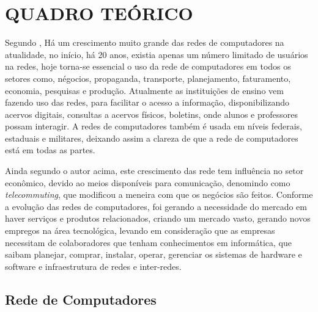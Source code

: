 
\chapter{QUADRO TEÓRICO}


\par Segundo , Há um crescimento muito grande das redes
de computadores na atualidade, no início, há 20 anos, existia apenas um número
limitado de usuários na redes, hoje torna-se essencial o uso da rede de
computadores em todos os setores como, négocios, propaganda, transporte,
planejamento, faturamento, economia, pesquisas e produção. Atualmente as
instituições de ensino vem fazendo uso das redes, para facilitar o acesso a
informação, disponibilizando acervos digitais, consultas a acervos físicos,
boletins, onde alunos e professores possam interagir. A redes de computadores
também é usada em níveis federais, estaduais e militares, deixando assim a
clareza de que a rede de computadores está em todas as partes.


\par Ainda segundo o autor acima, este crescimento das rede tem influência no
setor econômico, devido ao meios disponíveis para comunicação, denomindo como \textit{telecommuting},
que modificou a meneira com que os negócios são feitos. Conforme a evolução das
redes de computadores, foi gerando a necessidade do mercado em haver serviços e
produtos relacionados, criando um mercado vasto, gerando novos empregos na área
tecnológica, levando em consideração que as empresas necessitam de colaboradores
que tenham conhecimentos em informática, que saibam planejar, comprar, instalar,
operar, gerenciar os sistemas de hardware e software e infraestrutura de redes e
inter-redes. 

\section{Rede de Computadores}



